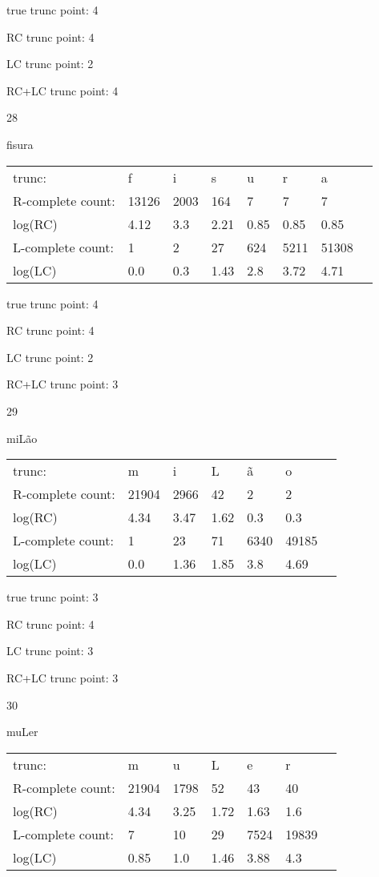 \documentclass{article}
\begin{document}
true trunc point: 4

RC trunc point: 4

LC trunc point: 2

RC+LC trunc point: 4

\vspace{1em}

28

fisura

\begin{tabular}{l|lllllll}
trunc: & f & i & s & u & r & a & \\ 
R-complete count: & 13126 & 2003 & 164 & 7 & 7 & 7 & \\ 
log(RC) & 4.12 & 3.3 & 2.21 & 0.85 & 0.85 & 0.85 & \\ 
L-complete count: & 1 & 2 & 27 & 624 & 5211 & 51308 & \\ 
log(LC) & 0.0 & 0.3 & 1.43 & 2.8 & 3.72 & 4.71 & \\ 
\end{tabular}

true trunc point: 4

RC trunc point: 4

LC trunc point: 2

RC+LC trunc point: 3

\newpage

29

miLão

\begin{tabular}{l|llllll}
trunc: & m & i & L & ã & o & \\ 
R-complete count: & 21904 & 2966 & 42 & 2 & 2 & \\ 
log(RC) & 4.34 & 3.47 & 1.62 & 0.3 & 0.3 & \\ 
L-complete count: & 1 & 23 & 71 & 6340 & 49185 & \\ 
log(LC) & 0.0 & 1.36 & 1.85 & 3.8 & 4.69 & \\ 
\end{tabular}

true trunc point: 3

RC trunc point: 4

LC trunc point: 3

RC+LC trunc point: 3

\vspace{1em}

30

muLer

\begin{tabular}{l|llllll}
trunc: & m & u & L & e & r & \\ 
R-complete count: & 21904 & 1798 & 52 & 43 & 40 & \\ 
log(RC) & 4.34 & 3.25 & 1.72 & 1.63 & 1.6 & \\ 
L-complete count: & 7 & 10 & 29 & 7524 & 19839 & \\ 
log(LC) & 0.85 & 1.0 & 1.46 & 3.88 & 4.3 & \\ 
\end{tabular}
\end{document}
